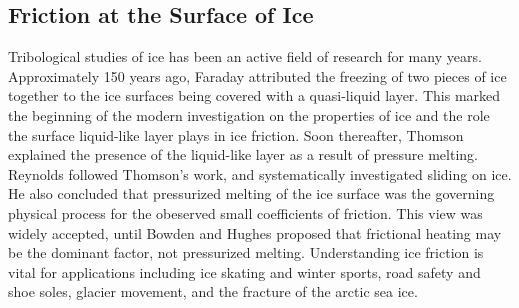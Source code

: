 \subsection{Friction at the Surface of Ice}

Tribological studies of ice has been an active field of research for
many years.  Approximately 150 years ago, Faraday attributed the
freezing of two pieces of ice together to the ice surfaces being
covered with a quasi-liquid layer.\cite{Faraday1859} This marked the
beginning of the modern investigation on the properties of ice and the
role the surface liquid-like layer plays in ice friction. Soon
thereafter, Thomson explained the presence of the liquid-like layer as
a result of pressure melting.\cite{Thomson1859} Reynolds followed
Thomson's work, and systematically investigated sliding on ice. He
also concluded that pressurized melting of the ice surface was the
governing physical process for the obeserved small coefficients of
friction.\cite{Reynolds1901} This view was widely accepted, until
Bowden and Hughes proposed that frictional heating may be the dominant
factor, not pressurized melting.\cite{Bowden1939} Understanding ice
friction is vital for applications including ice skating and winter
sports\cite{Rosenberg2005,Kietzig2010}, road safety and shoe
soles\cite{Roberts1981,Higgins2008}, glacier
movement\cite{Casassa1991, Sukhorukov2013, Pritchard2012}, and the
fracture of the arctic sea
ice\cite{Schulson2004,Weiss2007,Feltham2008,Lishman2011,Lishman2013}.





